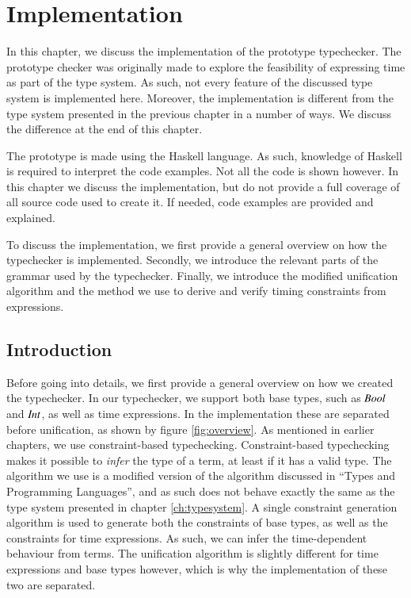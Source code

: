 \newcommand{\transreceptor}[3]{%
  \path [linepart] (#1.east) -- node [above]
    {\scriptsize Transreceptor #2} (#3);}

\chapter{Implementation}
In this chapter, we discuss the implementation of the prototype typechecker.
The prototype checker was originally made to explore the feasibility of expressing time as part of the type system.
As such, not every feature of the discussed type system is implemented here.
Moreover, the implementation is different from the type system presented in the previous chapter in a number of ways.
We discuss the difference at the end of this chapter.

The prototype is made using the Haskell language. 
As such, knowledge of Haskell is required to interpret the code examples.
Not all the code is shown however.
In this chapter we discuss the implementation, but do not provide a full coverage of all source code used to create it.
If needed, code examples are provided and explained.

To discuss the implementation, we first provide a general overview on how the typechecker is implemented.
Secondly, we introduce the relevant parts of the grammar used by the typechecker.
Finally, we introduce the modified unification algorithm and the method we use to derive and verify timing constraints from expressions. 

\section{Introduction}
Before going into details, we first provide a general overview on how we created the typechecker.
In our typechecker, we support both base types, such as \ensuremath{\Conid{Bool}} and \ensuremath{\Conid{Int}}, as well as time expressions.
In the implementation these are separated before unification, as shown by figure \ref{fig:overview}.
As mentioned in earlier chapters, we use constraint-based typechecking.
Constraint-based typechecking makes it possible to \textit{infer} the type of a term, at least if it has a valid type.
The algorithm we use is a modified version of the algorithm discussed in ``Types and Programming Languages''\cite{pierce2002types}, and as such does not behave exactly the same as the type system presented in chapter \ref{ch:typesystem}.
A single constraint generation algorithm is used to generate both the constraints of base types, as well as the constraints for time expressions.
As such, we can infer the time-dependent behaviour from terms.
The unification algorithm is slightly different for time expressions and base types however, which is why the implementation of these two are separated.

